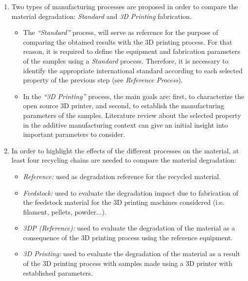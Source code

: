 \begin{enumerate}
	\item Two types of manufacturing processes are proposed in order to compare the material degradation:
	\textit{Standard} and \textit{3D Printing} fabrication. 
	
	\begin{itemize}[noitemsep]
		
		\item 	The \textit{``Standard''} process, will serve as reference for the purpose of comparing the obtained results with the 3D printing process. 
		For that reason, it is required to define the equipment and fabrication parameters of the samples using a \textit{Standard} process. 
		Therefore, it is necessary to identify the appropriate international standard according to each selected property of the previous step (see \textit{Reference Process}).
		
		\item 	In the \textit{``3D Printing''} process, the main goals are: first, to characterize the open source 3D printer, and second, to establish the manufacturing parameters of the samples. 
		Literature review about the selected property in the additive manufacturing context can give an initial insight into important parameters to consider.
	\end{itemize}

		\item 	 In order to highlight the effects of the different processes on the material, at least four recycling chains are needed to compare the material degradation:
			
			\begin{itemize}[noitemsep]
				\item \textit{Reference:} used as degradation reference for the recycled material.
				\item	\textit{Feedstock:} used to evaluate the degradation impact due to fabrication of the  feedstock material for the 3D printing machines considered (i.e. filament, pellets, powder...).
				\item  \textit{3DP (Reference):} used to evaluate the degradation of the material as a consequence of the 3D printing process using the reference equipment.
				\item \textit{3D Printing:} used to evaluate the degradation of the material as a result of the 3D printing process with samples made using a 3D printer with established parameters.		
			\end{itemize} 
	

	
\end{enumerate}

